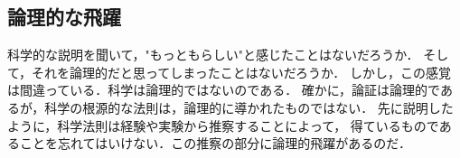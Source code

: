         \subsection{論理的な飛躍}
            科学的な説明を聞いて，"もっともらしい"と感じたことはないだろうか．
            そして，それを論理的だと思ってしまったことはないだろうか．
            しかし，この感覚は間違っている．科学は論理的ではないのである．
            確かに，論証は論理的であるが，科学の根源的な法則は，論理的に導かれたものではない．
            先に説明したように，科学法則は経験や実験から推察することによって，
            得ているものであることを忘れてはいけない．この推察の部分に論理的飛躍があるのだ．

